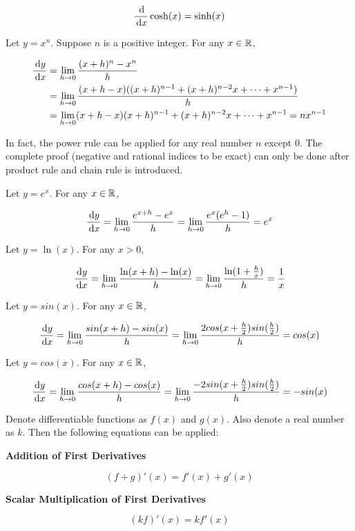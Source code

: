 \documentclass[a4paper,12pt]{article}
\begin{document}
\begin{pst}
\begin{alist}
    $$\frac{\,\mathrm{d}}{\,\mathrm{d} x}\cosh(x)=\sinh(x)$$
  \end{alist}

  \prf{} Let $y=x^{n}$. Suppose $n$ is a positive integer. For any $x\in \mathbb{R}$,

  $$\begin{aligned}[t]
    \frac{\,\mathrm{d} y}{\,\mathrm{d} x}&=\lim_{h\to 0}\frac{(x+h)^{n}-x^{n}}{h}\\
    &=\lim_{h\to 0}\frac{(x+h-x)((x+h)^{n-1}+(x+h)^{n-2}x+\cdots+x^{n-1})}{h}\\
    &=\lim_{h\to 0}(x+h-x)(x+h)^{n-1}+(x+h)^{n-2}x+\cdots+x^{n-1}=nx^{n-1}
  \end{aligned}$$\s

  In fact, the power rule can be applied for any real number $n$ except $0$. The complete proof (negative and rational indices to be exact) can only be done after product rule and chain rule is introduced.\n

   Let $y=e^{x}$. For any $x \in \mathbb{R}$,

  $$\frac{\,\mathrm{d} y}{\,\mathrm{d} x}=\lim_{h\to 0}\frac{e^{x+h}-e^{x}}{h}=\lim_{h\to 0}\frac{e^{x}(e^{h}-1)}{h}=e^{x}$$

   Let $y=\ln(x)$. For any $x>0$,

  $$\frac{\,\mathrm{d} y}{\,\mathrm{d} x}=\lim_{h\to 0}\frac{\ln(x+h)-\ln(x)}{h}=\lim_{h\to 0}\frac{\ln(1+\frac{h}{x})}{h}=\frac{1}{x}$$

   Let $y=sin(x)$. For any $x\in \mathbb{R}$,

  $$\frac{\,\mathrm{d} y}{\,\mathrm{d} x}=\lim_{h\to 0}\frac{sin(x+h)-sin(x)}{h}=\lim_{h\to 0}\frac{2cos(x+\frac{h}{2})sin(\frac{h}{2})}{h}=cos(x)$$

   Let $y=cos(x)$. For any $x\in \mathbb{R}$,

  $$\frac{\,\mathrm{d} y}{\,\mathrm{d} x}=\lim_{h\to 0}\frac{cos(x+h)-cos(x)}{h}=\lim_{h\to 0}\frac{-2sin(x+\frac{h}{2})sin(\frac{h}{2})}{h}=-sin(x)$$
\end{pst}\n

\begin{pst}
  Denote differentiable functions as $f(x)$ and $g(x)$. Also denote a real number as $k$. Then the following equations can be applied:

  \begin{alist}
    \item \textbf{Addition of First Derivatives}

    $$(f+g)'(x)=f'(x)+g'(x)$$

    \item \textbf{Scalar Multiplication of First Derivatives}

    $$(kf)'(x)=kf'(x)$$
  \end{alist}
\end{pst}
\end{document}
